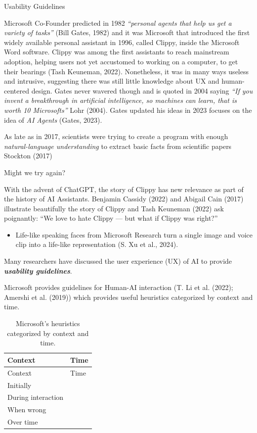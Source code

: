 \documentclass[
  letterpaper,
  DIV=11,
  numbers=noendperiod]{scrartcl}
\providecommand{\tightlist}{%
  \setlength{\itemsep}{0pt}\setlength{\parskip}{0pt}}\usepackage{longtable,booktabs,array}
\begin{document}
Usability Guidelines

Microsoft Co-Founder predicted in 1982 \emph{``personal agents that help
us get a variety of tasks''} (Bill Gates, 1982) and it was Microsoft
that introduced the first widely available personal assistant in 1996,
called Clippy, inside the Microsoft Word software. Clippy was among the
first assistants to reach mainstream adoption, helping users not yet
accustomed to working on a computer, to get their bearings (Tash
Keuneman, 2022). Nonetheless, it was in many ways useless and intrusive,
suggesting there was still little knowledge about UX and human-centered
design. Gates never wavered though and is quoted in 2004 saying
\emph{``If you invent a breakthrough in artificial intelligence, so
machines can learn, that is worth 10 Microsofts''} Lohr (2004). Gates
updated his ideas in 2023 focuses on the idea of \emph{AI Agents}
(Gates, 2023).

As late as in 2017, scientists were trying to create a program with
enough \emph{natural-language understanding} to extract basic facts from
scientific papers Stockton (2017)

Might we try again?

With the advent of ChatGPT, the story of Clippy has new relevance as
part of the history of AI Assistants. Benjamin Cassidy (2022) and
Abigail Cain (2017) illustrate beautifully the story of Clippy and Tash
Keuneman (2022) ask poignantly: ``We love to hate Clippy --- but what if
Clippy was right?''

\begin{itemize}
\tightlist
\item
  Life-like speaking faces from Microsoft Research turn a single image
  and voice clip into a life-like representation (S. Xu et al., 2024).
\end{itemize}

Many researchers have discussed the user experience (UX) of AI to
provide \textbf{\emph{usability guidelines}}.

Microsoft provides guidelines for Human-AI interaction (T. Li et al.
(2022); Amershi et al. (2019)) which provides useful heuristics
categorized by context and time.

\begin{longtable}[]{@{}ll@{}}
\caption{Microsoft's heuristics categorized by context and
time.}\tabularnewline
\toprule\noalign{}
Context & Time \\
\midrule\noalign{}
\endfirsthead
\toprule\noalign{}
Context & Time \\
\midrule\noalign{}
\endhead
\bottomrule\noalign{}
\endlastfoot
Initially & \\
During interaction & \\
When wrong & \\
Over time & \\
\end{longtable}
\end{document}
